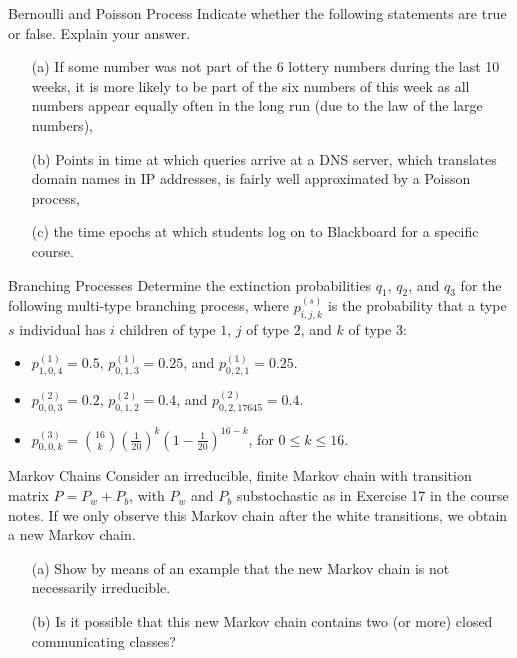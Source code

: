 \begin{problem}{Bernoulli and Poisson Process}
 Indicate whether the following statements are true or false. Explain your answer.
	\begin{itemize}
		\item[(a)] If some number was not part of the 6 lottery numbers during the last 10 weeks, it is more likely to be part of the six numbers of this week as all numbers appear equally often in the long run (due to the law of the large numbers),
		\item[(b)] Points in time at which queries arrive at a DNS server, which translates domain names in IP addresses, is fairly well approximated by a Poisson process,
		\item[(c)] the time epochs at which students log on to Blackboard for a specific course.
	\end{itemize}
\end{problem}

\begin{problem}{Branching Processes}
Determine the extinction probabilities $q_1$, $q_2$, and $q_3$ for the
following multi-type branching process, where $p^{(s)}_{i,j,k}$ is the probability that a type $s$ individual
has $i$ children of type $1$, $j$ of type $2$, and $k$ of type $3$:
\begin{itemize}
    \item $p^{(1)}_{1,0,4} = 0.5$, $p^{(1)}_{0,1,3} = 0.25$, and $p^{(1)}_{0,2,1} = 0.25$.
    \item $p^{(2)}_{0,0,3} = 0.2$, $p^{(2)}_{0,1,2} = 0.4$, and $p^{(2)}_{0,2,17645} = 0.4$.
    \item $p^{(3)}_{0,0,k} = \binom{16}{k} \left( \frac{1}{20} \right)^k \left(1 - \frac{1}{20}\right)^{16 - k}$, for $0 \leq k \leq 16$.
\end{itemize}
\end{problem}

\begin{problem}{Markov Chains}
Consider an irreducible, finite Markov chain with transition matrix
$P = P_w + P_b$, with $P_w$ and $P_b$ substochastic as in Exercise 17 in the course notes. If
we only observe this Markov chain after the white transitions, we obtain a new Markov
chain.
\begin{itemize}
    \item[(a)] Show by means of an example that the new Markov chain is not necessarily irreducible.
    \item[(b)] Is it possible that this new Markov chain contains two (or more) closed communicating classes?
\end{itemize}
\end{problem}

